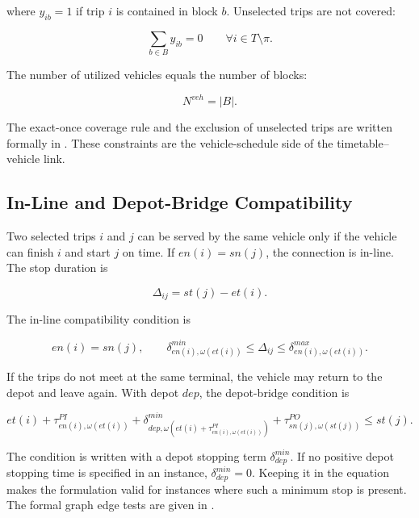 where \(y_{ib}=1\) if trip \(i\) is contained in block \(b\). Unselected trips
are not covered:

\begin{equation}
\sum_{b\in B} y_{ib}=0
\qquad
\forall i\in T\setminus\pi.
\label{eq:problem-unselected-trips}
\end{equation}

The number of utilized vehicles equals the number of blocks:

\begin{equation}
N^{veh}=|B|.
\label{eq:problem-vehicle-count}
\end{equation}

The exact-once coverage rule and the exclusion of unselected trips are written
formally in . These
constraints are the vehicle-schedule side of the timetable--vehicle link.

\subsection{In-Line and Depot-Bridge Compatibility}

Two selected trips \(i\) and \(j\) can be served by the same vehicle only if the
vehicle can finish \(i\) and start \(j\) on time. If \(en(i)=sn(j)\), the
connection is in-line. The stop duration is

\begin{equation}
\Delta_{ij}=st(j)-et(i).
\label{eq:inline-stop-duration-problem}
\end{equation}

The in-line compatibility condition is

\begin{equation}
en(i)=sn(j),
\qquad
\delta^{min}_{en(i),\omega(et(i))}
\le \Delta_{ij}\le
\delta^{max}_{en(i),\omega(et(i))}.
\label{eq:problem-inline-compatibility}
\end{equation}

If the trips do not meet at the same terminal, the vehicle may return to the
depot and leave again. With depot \(dep\), the depot-bridge condition is

\begin{equation}
et(i)
+\tau^{PI}_{en(i),\omega(et(i))}
+\delta^{min}_{dep,\omega(et(i)+\tau^{PI}_{en(i),\omega(et(i))})}
+\tau^{PO}_{sn(j),\omega(st(j))}
\le st(j).
\label{eq:problem-depot-bridge}
\end{equation}

The condition is written with a depot stopping term \(\delta^{min}_{dep}\).
If no positive depot stopping time is specified in an instance,
\(\delta^{min}_{dep}=0\). Keeping it in the equation makes the formulation valid
for instances where such a minimum stop is present. The formal graph edge tests
are given in .

